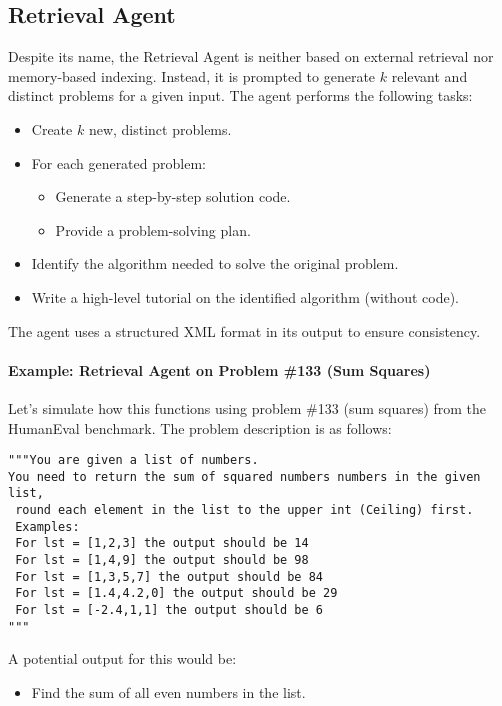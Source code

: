 \documentclass[11pt,a4paper]{article}
\begin{document}
\subsection{Retrieval Agent}
Despite its name, the Retrieval Agent is neither based on external retrieval nor memory-based indexing. Instead, it is prompted to generate $k$ relevant and distinct problems for a given input. The agent performs the following tasks:

\begin{itemize}
  \item Create $k$ new, distinct problems.
  \item For each generated problem:
  \begin{itemize}
    \item Generate a step-by-step solution code.
    \item Provide a problem-solving plan.
  \end{itemize}
  \item Identify the algorithm needed to solve the original problem.
  \item Write a high-level tutorial on the identified algorithm (without code).
\end{itemize}

The agent uses a structured XML format in its output to ensure consistency.

\paragraph{Example: Retrieval Agent on Problem \#133 (Sum Squares)}

Let’s simulate how this functions using problem \#133 (sum squares) from the HumanEval benchmark. The problem description is as follows:

\begin{verbatim}
"""You are given a list of numbers.
You need to return the sum of squared numbers numbers in the given list,
 round each element in the list to the upper int (Ceiling) first.
 Examples:
 For lst = [1,2,3] the output should be 14
 For lst = [1,4,9] the output should be 98
 For lst = [1,3,5,7] the output should be 84
 For lst = [1.4,4.2,0] the output should be 29
 For lst = [-2.4,1,1] the output should be 6
"""
\end{verbatim}

A potential output for this would be:
\begin{itemize}
  \item Find the sum of all even numbers in the list.
\end{itemize}
\end{document}
